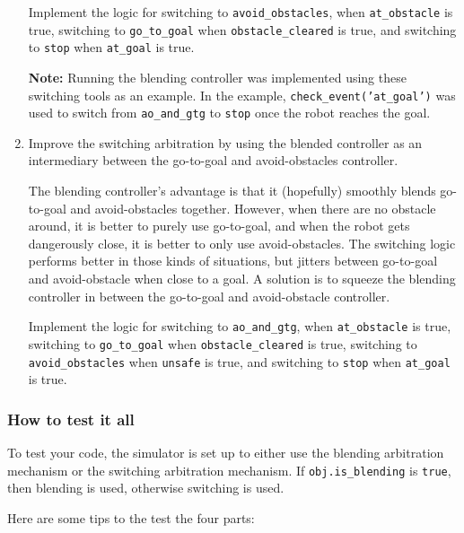 \documentclass[10pt]{article}
\begin{document}
\begin{enumerate}
  Implement the logic for switching to \texttt{avoid\_obstacles}, when \texttt{at\_obstacle} is true, switching to \texttt{go\_to\_goal} when \texttt{obstacle\_cleared} is true, and switching to \texttt{stop} when \texttt{at\_goal} is true. 
  
  
  \textbf{Note:} Running the blending controller was implemented using these switching tools as an example. In the example, \texttt{check\_event('at\_goal')} was used to switch from \texttt{ao\_and\_gtg} to \texttt{stop} once the robot reaches the goal.
  
  \item Improve the switching arbitration by using the blended controller as an intermediary between the go-to-goal and avoid-obstacles controller.
  
  The blending controller's advantage is that it (hopefully) smoothly blends go-to-goal and avoid-obstacles together. However, when there are no obstacle around, it is better to purely use go-to-goal, and when the robot gets dangerously close, it is better to only use avoid-obstacles. The switching logic performs better in those kinds of situations, but jitters between go-to-goal and avoid-obstacle when close to a goal. A solution is to squeeze the blending controller in between the go-to-goal and avoid-obstacle controller.
  
  Implement the logic for switching to \texttt{ao\_and\_gtg}, when \texttt{at\_obstacle} is true, switching to \texttt{go\_to\_goal} when \texttt{obstacle\_cleared} is true, switching to \texttt{avoid\_obstacles} when \texttt{unsafe} is true, and switching to \texttt{stop} when \texttt{at\_goal} is true.
\end{enumerate}

\subsubsection*{How to test it all}

To test your code, the simulator is set up to either use the blending arbitration mechanism or the switching arbitration mechanism. If \texttt{obj.is\_blending} is \texttt{true}, then blending is used, otherwise switching is used. 

Here are some tips to the test the four parts:
\end{document}
